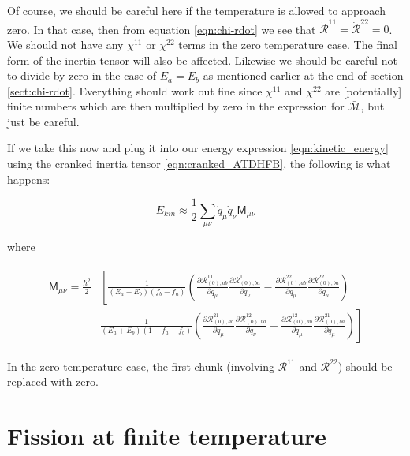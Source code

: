\noindent Of course, we should be careful here if the temperature is allowed to approach zero. In that case, then from equation \ref{eqn:chi-rdot} we see that $\mathcal{\dot{R}}^{11}=\mathcal{\dot{R}}^{22}=0$. We should not have any $\chi^{11}$ or $\chi^{22}$ terms in the zero temperature case. The final form of the inertia tensor will also be affected. Likewise we should be careful not to divide by zero in the case of $E_a=E_b$ as mentioned earlier at the end of section \ref{sect:chi-rdot}. Everything should work out fine since $\chi^{11}$ and $\chi^{22}$ are [potentially] finite numbers which are then multiplied by zero in the expression for $\mathcal{\bar{M}}$, but just be careful.

If we take this now and plug it into our energy expression \ref{eqn:kinetic_energy} using the cranked inertia tensor \ref{eqn:cranked_ATDHFB}, the following is what happens:

\begin{tcolorbox}
\begin{equation}
E_{kin} \approx \frac{1}{2}\sum_{\mu\nu}\dot{q}_\mu\dot{q}_\nu\mathsf{M}_{\mu\nu}
\end{equation}
\end{tcolorbox}

\noindent where

\begin{tcolorbox}
\begin{align}
\begin{aligned}
\mathsf{M}_{\mu\nu} =  \frac{\hbar^2}{2}&\left[\frac{1}{(E_a-E_b)(f_b-f_a)}\left(\frac{\partial\mathcal{R}^{11}_{(0),ab}}{\partial q_\mu}\frac{\partial\mathcal{R}^{11}_{(0),ba}}{\partial q_\nu}-\frac{\partial\mathcal{R}^{22}_{(0),ab}}{\partial q_\mu}\frac{\partial\mathcal{R}^{22}_{(0),ba}}{\partial q_\mu}\right)\right. \\
&\left.\frac{1}{(E_a+E_b)(1-f_a-f_b)}\left(\frac{\partial\mathcal{R}^{21}_{(0),ab}}{\partial q_\mu}\frac{\partial\mathcal{R}^{12}_{(0),ba}}{\partial q_\nu}-\frac{\partial\mathcal{R}^{12}_{(0),ab}}{\partial q_\mu}\frac{\partial\mathcal{R}^{21}_{(0),ba}}{\partial q_\mu}\right)\right]
\end{aligned}
\end{align}
\end{tcolorbox}

\noindent In the zero temperature case, the first chunk (involving $\mathcal{R}^{11}$ and $\mathcal{R}^{22}$) should be replaced with zero.

\section{Fission at finite temperature}

